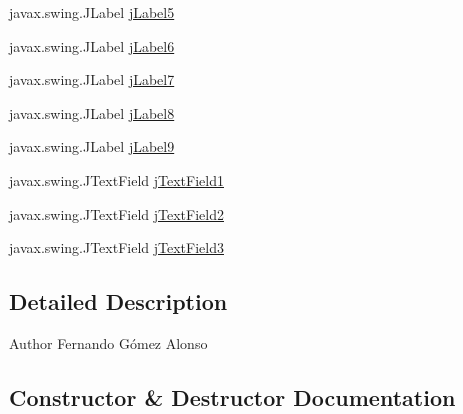 \begin{DoxyCompactItemize}
\item 
javax.\+swing.\+J\+Label \mbox{\hyperlink{class_interfaz_package_1_1_verificar_libro_af0ca29553abca825c883eacf5e075ce6}{j\+Label5}}
\item 
javax.\+swing.\+J\+Label \mbox{\hyperlink{class_interfaz_package_1_1_verificar_libro_a5ed33c5473e49a9a27a02f94f1152818}{j\+Label6}}
\item 
javax.\+swing.\+J\+Label \mbox{\hyperlink{class_interfaz_package_1_1_verificar_libro_a6e28a406ea8abbcc35d06c8ea648882c}{j\+Label7}}
\item 
javax.\+swing.\+J\+Label \mbox{\hyperlink{class_interfaz_package_1_1_verificar_libro_a31cbff3e8a6d5b60fc95e9ee6505ffaf}{j\+Label8}}
\item 
javax.\+swing.\+J\+Label \mbox{\hyperlink{class_interfaz_package_1_1_verificar_libro_ad47175a24ea896af5265b3635c95852e}{j\+Label9}}
\item 
javax.\+swing.\+J\+Text\+Field \mbox{\hyperlink{class_interfaz_package_1_1_verificar_libro_a0056a9edc1fada73cb6c0ce0ec712df0}{j\+Text\+Field1}}
\item 
javax.\+swing.\+J\+Text\+Field \mbox{\hyperlink{class_interfaz_package_1_1_verificar_libro_a3ad7fdfe6c4d2e934089b98775f6afb9}{j\+Text\+Field2}}
\item 
javax.\+swing.\+J\+Text\+Field \mbox{\hyperlink{class_interfaz_package_1_1_verificar_libro_ade0c8f7abc79d9be6cedf3651f98b597}{j\+Text\+Field3}}
\end{DoxyCompactItemize}


\subsection{Detailed Description}
\begin{DoxyAuthor}{Author}
Fernando Gómez Alonso 
\end{DoxyAuthor}


\subsection{Constructor \& Destructor Documentation}
\mbox{\label{class_interfaz_package_1_1_verificar_libro_ac01e8d1171535f57f24d6eed709a3d2b}} 
